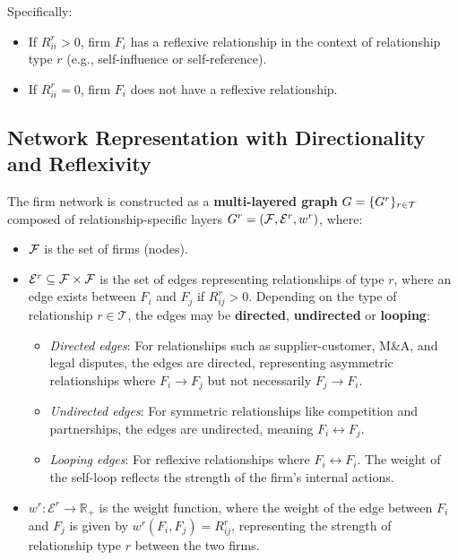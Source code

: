 Specifically:
\begin{itemize}
  \item If $R_{i i}^r>0$, firm $F_i$ has a reflexive relationship in the context of relationship type $r$ (e.g., self-influence or self-reference).
  \item If $R_{i i}^r=0$, firm $F_i$ does not have a reflexive relationship.

\end{itemize}


\subsection{Network Representation with Directionality and Reflexivity}

The firm network is constructed as a \textbf{multi-layered graph} $G=\{G^r\}_{r\in\mathcal{T}}$
composed of relationship-specific layers $G^r=\left(\mathcal{F}, \mathcal{E}^r, w^r\right)$, where:
\begin{itemize}
  \item $\mathcal{F}$ is the set of firms (nodes).
  \item $\mathcal{E}^r \subseteq \mathcal{F} \times \mathcal{F}$ is the set of edges representing relationships of type $r$, where an edge exists between $F_i$ and $F_j$ if $R_{i j}^r>0$. Depending on the type of relationship $r \in \mathcal{T}$, the edges may be \textbf{directed}, \textbf{undirected} or \textbf{looping}:
\begin{itemize}
    \item \textit{Directed edges}: For relationships such as supplier-customer, M\&A, and legal disputes, the edges are directed, representing asymmetric relationships where $ F_i \to F_j $ but not necessarily $ F_j \to F_i $.
    \item \textit{Undirected edges}: For symmetric relationships like competition and partnerships, the edges are undirected, meaning $ F_i \leftrightarrow F_j $.
    \item \textit{Looping edges}: For reflexive relationships where $F_i\leftrightarrow F_i$. The weight of the self-loop reflects the strength of the firm's internal actions.
\end{itemize}
  \item $w^r: \mathcal{E}^r \rightarrow \mathbb{R}_{+}$ is the weight function, where the weight of the edge between $F_i$ and $F_j$ is given by $w^r\left(F_i, F_j\right)=R_{i j}^r$, representing the strength of relationship type $r$ between the two firms.
\end{itemize}

